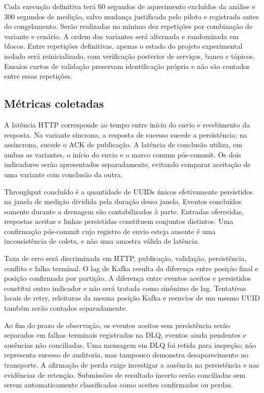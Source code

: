 Cada execução definitiva terá 60 segundos de aquecimento excluídos da análise e 300 segundos de medição, salvo mudança justificada pelo piloto e registrada antes do congelamento. Serão realizadas no mínimo dez repetições por combinação de variante e cenário. A ordem das variantes será alternada e randomizada em blocos. Entre repetições definitivas, apenas o estado do projeto experimental isolado será reinicializado, com verificação posterior de serviços, banco e tópicos. Ensaios curtos de validação preservam identificação própria e não são contados entre essas repetições.

\subsection{Métricas coletadas}
A latência HTTP corresponde ao tempo entre início do envio e recebimento da resposta. Na variante síncrona, a resposta de sucesso sucede a persistência; na assíncrona, sucede o ACK de publicação. A latência de conclusão utiliza, em ambas as variantes, o início do envio e o marco comum pós-commit. Os dois indicadores serão apresentados separadamente, evitando comparar aceitação de uma variante com conclusão da outra.

Throughput concluído é a quantidade de UUIDs únicos efetivamente persistidos na janela de medição dividida pela duração dessa janela. Eventos concluídos somente durante a drenagem são contabilizados à parte. Entradas oferecidas, respostas aceitas e linhas persistidas constituem conjuntos distintos. Uma confirmação pós-commit cujo registro de envio esteja ausente é uma inconsistência de coleta, e não uma amostra válida de latência.

Taxa de erro será discriminada em HTTP, publicação, validação, persistência, conflito e falha terminal. O lag de Kafka resulta da diferença entre posição final e posição confirmada por partição. A diferença entre eventos aceitos e persistidos constitui outro indicador e não será tratada como sinônimo de lag. Tentativas locais de retry, releituras da mesma posição Kafka e reenvios de um mesmo UUID também serão contados separadamente.

Ao fim do prazo de observação, os eventos aceitos sem persistência serão separados em falhas terminais registradas na DLQ, eventos ainda pendentes e ausências não conciliadas. Uma mensagem em DLQ foi retida para inspeção; não representa sucesso de auditoria, mas tampouco demonstra desaparecimento no transporte. A afirmação de perda exige investigar a ausência na persistência e nas evidências de retenção. Submissões de resultado incerto serão conciliadas sem serem automaticamente classificadas como aceites confirmados ou perdas.

